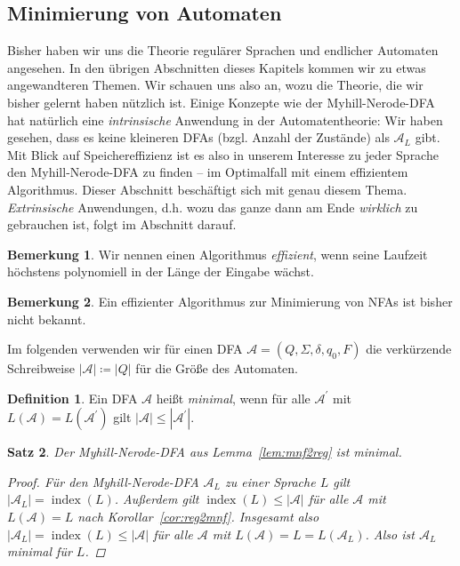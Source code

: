 \documentclass[11pt, a4paper]{article}
\theoremstyle{definition}
\newtheorem{definition}{Definition}[section]
\newtheorem*{remark*}{Bemerkung}
\theoremstyle{plain}
\newtheorem{theorem}[definition]{Satz}
\numberwithin{equation}{section}
\DeclareMathOperator{\ind}{index}
\begin{document}
\subsection{Minimierung von Automaten}\label{sec:regular_minimization}
Bisher haben wir uns die Theorie regulärer Sprachen und endlicher Automaten angesehen. In den übrigen Abschnitten dieses Kapitels kommen wir zu etwas angewandteren Themen. Wir schauen uns also an, wozu die Theorie, die wir bisher gelernt haben nützlich ist. Einige Konzepte wie der Myhill-Nerode-DFA hat natürlich eine \textit{intrinsische} Anwendung in der Automatentheorie: Wir haben gesehen, dass es keine kleineren DFAs (bzgl. Anzahl der Zustände) als $\mathcal{A}_L$ gibt. Mit Blick auf Speichereffizienz ist es also in unserem Interesse zu jeder Sprache den Myhill-Nerode-DFA zu finden -- im Optimalfall mit einem effizientem Algorithmus. Dieser Abschnitt beschäftigt sich mit genau diesem Thema. \textit{Extrinsische} Anwendungen, d.h. wozu das ganze dann am Ende \textit{wirklich} zu gebrauchen ist, folgt im Abschnitt darauf.
\begin{remark*}
	Wir nennen einen Algorithmus \textit{effizient}, wenn seine Laufzeit höchstens polynomiell in der Länge der Eingabe wächst.
\end{remark*}
\begin{remark*}
	Ein effizienter Algorithmus zur Minimierung von NFAs ist bisher nicht bekannt.
\end{remark*}
Im folgenden verwenden wir für einen DFA $\mathcal{A} = (Q, \Sigma, \delta, q_0, F)$ die verkürzende Schreibweise $|\mathcal{A}| \coloneqq |Q|$ für die Größe des Automaten.
\begin{definition}
	Ein DFA $\mathcal{A}$ heißt \textit{minimal}, wenn für alle $\mathcal{A}^\prime$ mit $L(\mathcal{A}) = L(\mathcal{A}^\prime)$ gilt $|\mathcal{A}| \leq |\mathcal{A}^\prime|$.
\end{definition}
\begin{theorem}\label{thm:mndfamin}
	Der Myhill-Nerode-DFA aus Lemma~\ref{lem:mnf2reg} ist minimal.
	\begin{proof}
		Für den Myhill-Nerode-DFA $\mathcal{A}_L$ zu einer Sprache $L$ gilt $|\mathcal{A}_L| = \ind(L)$. Außerdem gilt $\ind(L) \leq |\mathcal{A}|$ für alle $\mathcal{A}$ mit $L(\mathcal{A}) = L$ nach Korollar~\ref{cor:reg2mnf}. Insgesamt also $|\mathcal{A}_L| = \ind(L) \leq |\mathcal{A}|$ für alle $\mathcal{A}$ mit $L(\mathcal{A}) = L = L(\mathcal{A}_L)$. Also ist $\mathcal{A}_L$ minimal für $L$.
	\end{proof}
\end{theorem}
\end{document}
